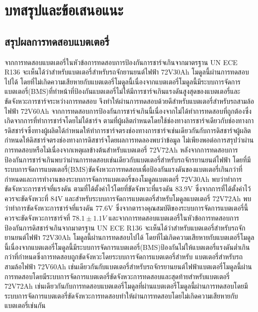\nopagebreak
\chapter{บทสรุปและข้อเสนอแนะ}
\section{สรุปผลการทดสอบแบตเตอรี่}
จากการทดสอบแบตเตอรี่ในหัวข้อการทดสอบการป้องกันการชาร์จเกินจากมาตรฐาน UN ECE R136 จะเห็นได้ว่าสำหรับแบตเตอรี่สำหรับรถจักยานยนต์ไฟฟ้า 72V30Ah โมดูลนี้ผ่านการทดสอบไปได้
โดยที่ไม่เกิดความเสียหายกับแบตเตอรี่โมดูลนี้เนื่องจากแบตเตอรี่โมดูลนี้มีระบบการจัดการแบตเตอรี่(BMS)ที่ทำหน้าที่ป้องกันแบตเตอรี่ไม่ให้มีการชาร์จเกินแรงดันสูงสุดของแบตเตอรี่และขัดจังหวะการชาร์จระหว่างการทดสอบ
จึงทำให้ผ่านการทดสอบด้วยดีสำหรับแบตเตอรี่สำหรับรถสามล้อไฟฟ้า 72V60Ah จากการทดสอบการป้องกันการชาร์จเกินนี้เนื่องจากไม่ได้ทำการทดสอบที่ถูกต้องซึ่งเกิดจากการที่ทำการชาร์จโดยไม่ได้ชาร์จ
ตามที่ผู้ผลิตกำหนดโดยใช้ช่องทางการชาร์จเดียวกับช่องทางการดิสชาร์จซึ่งทางผู้ผลิตได้กำหนดให้ทำการชาร์จตรงช่องทางการชาร์จเช่นเดียวกันกับการดิสชาร์จผู้ผลิตกำหนดให้ดิสชาร์จตรงช่องทางการดิสชาร์จโดยผลการทดลองพบว่าข้อมูล
ไม่เพียงพอต่อการสรุปว่าผ่านการทดสอบหรือไม่เนื่องจากเหตุผลข้างต้นสำหรับแบตเตอรี่ 72V72Ah หลังจากการทดสอบการป้องกันการชาร์จเกินพบว่าผ่านการทดสอบเช่นเดียวกับแบตเตอรี่สำหรับรถจักรยานยนต์ไฟฟ้า
โดยที่มีระบบการจัดการแบตเตอรี่(BMS)ขัดจังหวะการทดสอบเพื่อป้องกันแรงดันของแบตเตอรี่เกินกว่าที่กำหนดและการทำงานของระบบการจัดการแบตเตอรี่ของโมดูลแบตเตอรี่ 72V30Ah พบว่าทำการขัดจังหวะการชาร์จที่แรงดัน
ตามที่ได้ตั้งค่าไว้โดยที่ขัดจังหวะที่แรงดัน 83.9V ซึ่งจากการที่ได้ตั้งค่าไว้ควรจะขัดจังหวะที่ 84V และสำหรับระบบการจัดการแบตเตอรี่สำหรับโมดูลแบตเตอรี่ 72V72Ah พบว่าทำการขัดจังหวะการชาร์จที่แรงดัน
77.6V ซึ่งจากตารางคุณสมบัติของระบบการจัดการแบตเตอรี่นี้ควรจะขัดจังหวะการชาร์จที่ $78.1\pm 1.1V$ 
\newline
\hspace*{2cm}
และจากการทดสอบแบตเตอรี่ในหัวข้อการทดสอบการป้องกันการดิสชาร์จเกินจากมาตรฐาน UN ECE R136 จะเห็นได้ว่าสำหรับแบตเตอรี่สำหรับรถจักยานยนต์ไฟฟ้า 72V30Ah โมดูลนี้ผ่านการทดสอบไปได้
โดยที่ไม่เกิดความเสียหายกับแบตเตอรี่โมดูลนี้เนื่องจากแบตเตอรี่โมดูลนี้มีระบบการจัดการแบตเตอรี่(BMS)ป้องกันไม่ให้แบตเตอรี่แรงดันต่ำเกินกว่าที่กำหนดซึ่งการทดสอบถูกขัดจังหวะโดยระบบการจัดการแบตเตอรี่สำหรับ
แบตเตอรี่สำหรับรถสามล้อไฟฟ้า 72V60Ah เช่นเดียวกันกับแบตเตอรี่สำหรับรถจักรยานยนต์ไฟฟ้าแบตเตอรี่โมดูลนี้ผ่านการทดสอบโดยมีระบบการจัดการแบตเตอรี่ขัดจังหวะการทดสอบและสุดท้ายสำหรับแบตเตอรี่ 72V72Ah
เช่นเดียวกันกับการทดสอบแบตเตอรี่โมดูลที่ผ่านแบตเตอรี่โมดูลนี้ผ่านการทดสอบโดยมีระบบการจัดการแบตเตอรี่ขัดจังหวะการทดสอบทำให้ผ่านการทดสอบโดยไม่เกิดความเสียหายกับแบตเตอรี่เช่นกัน 
